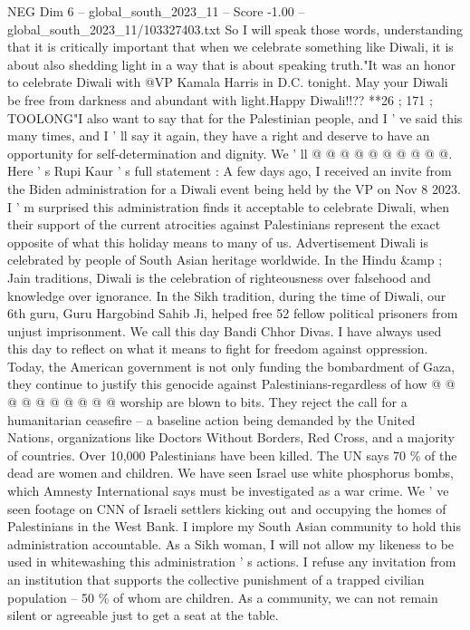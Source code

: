 \begin{textsample}{NEG Dim 6 – global\_south\_2023\_11 – Score -1.00 – global\_south\_2023\_11/103327403.txt}
So I will speak those words, understanding that it is critically important that when we celebrate something like Diwali, it is about also shedding light in a way that is about speaking truth."It was an honor to celebrate Diwali with @VP Kamala Harris in D.C. tonight.
May your Diwali be free from darkness and abundant with light.Happy Diwali!!?? **26 ; 171 ; TOOLONG"I also want to say that for the Palestinian people, and I ' ve said this many times, and I ' ll say it again, they have a right and deserve to have an opportunity for self-determination and dignity.
We ' ll @ @ @ @ @ @ @ @ @ @.
Here ' s Rupi Kaur ' s full statement : A few days ago, I received an invite from the Biden administration for a Diwali event being held by the VP on Nov 8 2023.
I ' m surprised this administration finds it acceptable to celebrate Diwali, when their support of the current atrocities against Palestinians represent the exact opposite of what this holiday means to many of us.
Advertisement Diwali is celebrated by people of South Asian heritage worldwide.
In the Hindu \&amp ; Jain traditions, Diwali is the celebration of righteousness over falsehood and knowledge over ignorance.
In the Sikh tradition, during the time of Diwali, our 6th guru, Guru Hargobind Sahib Ji, helped free 52 fellow political prisoners from unjust imprisonment.
We call this day Bandi Chhor Divas.
I have always used this day to reflect on what it means to fight for freedom against oppression.
Today, the American government is not only funding the bombardment of Gaza, they continue to justify this genocide against Palestinians-regardless of how @ @ @ @ @ @ @ @ @ @ worship are blown to bits.
They reject the call for a humanitarian ceasefire -- a baseline action being demanded by the United Nations, organizations like Doctors Without Borders, Red Cross, and a majority of countries.
Over 10,000 Palestinians have been killed.
The UN says 70 \% of the dead are women and children.
We have seen Israel use white phosphorus bombs, which Amnesty International says must be investigated as a war crime.
We ' ve seen footage on CNN of Israeli settlers kicking out and occupying the homes of Palestinians in the West Bank.
I implore my South Asian community to hold this administration accountable.
As a Sikh woman, I will not allow my likeness to be used in whitewashing this administration ' s actions.
I refuse any invitation from an institution that supports the collective punishment of a trapped civilian population -- 50 \% of whom are children.
As a community, we can not remain silent or agreeable just to get a seat at the table.

\end{textsample}
